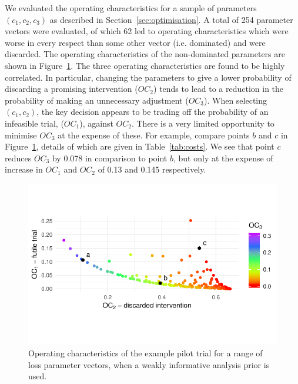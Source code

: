 \documentclass[AMA,STIX1COL]{WileyNJD-v2}
\begin{document}

We evaluated the operating characteristics for a sample of parameters $(c_1, c_2, c_3)$ as described in Section~\ref{sec:optimisation}. A total of 254 parameter vectors were evaluated, of which 62 led to operating characteristics which were worse in every respect than some other vector (i.e. dominated) and were discarded. The operating characteristics of the non-dominated parameters are shown in Figure~\ref{fig:p_front}. The three operating characteristics are found to be highly correlated. In particular, changing the parameters to give a lower probability of discarding a promising intervention ($OC_2$) tends to lead to a reduction in the probability of making an unnecessary adjustment ($OC_3$). When selecting $(c_1, c_2)$, the key decision appears to be trading off the probability of an infeasible trial, ($OC_{1}$), against $OC_{2}$. There is a very limited opportunity to minimise $OC_{3}$ at the expense of these. For example, compare points $b$ and $c$ in Figure~\ref{fig:p_front}, details of which are given in Table~\ref{tab:costs}. We see that point $c$ reduces $OC_3$ by 0.078 in comparison to point $b$, but only at the expense of increase in $OC_1$ and $OC_2$ of 0.13 and 0.145 respectively.

\begin{figure}
\centering
\includegraphics[scale=0.8]{./figures/p_front}
\caption{Operating characteristics of the example pilot trial for a range of loss parameter vectors, when a weakly informative analysis prior is used.}
\label{fig:p_front}
\end{figure}
\end{document}

